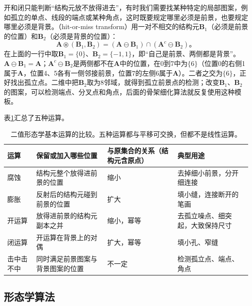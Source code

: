 开和闭只能判断“结构元放不放得进去”，有时我们需要找某种特定的局部图案，例如孤立的单点、线段的端点或某种角点，这时既要规定哪里必须是前景，也要规定哪里必须是背景。（hit-or-miss transform）用一对不相交的结构元$\bm{B}_1$（必须是前景的位置）和$\bm{B}_2$（必须是背景的位置）：
\begin{equation}
  \bm{A}\circledast(\bm{B}_1,\bm{B}_2)=(\bm{A}\ominus\bm{B}_1)\cap(\bm{A}^{c}\ominus\bm{B}_2)\text{。}
  \label{eq:vision-transforms-hit-or-miss}
\end{equation}
在上面的一行中取$\bm{B}_1=\{0\}$、$\bm{B}_2=\{-1,1\}$，即“自己是前景、两侧都是背景”。$\bm{A}\ominus\bm{B}_1=\bm{A}$；$\bm{A}^{c}\ominus\bm{B}_2$是两侧都不在$\bm{A}$中的位置，在0到7中为$\{6\}$（位置0的右侧1属于$\bm{A}$，位置4、5各有一侧邻接前景，位置7的左侧6属于$\bm{A}$）。二者之交为$\{6\}$，正好找出孤立点。二维中把$\bm{B}_2$取为8邻域，就得到孤立前景点的检测；改变$\bm{B}_1$、$\bm{B}_2$的图案，可以检测端点、分叉点和角点，后面的骨架细化算法就反复使用这种模板。

表\ref{tab:vision-transforms-morphology-compare}汇总了五种运算。

\begin{table}[htbp]
  \centering
  \small
  \begin{tabularx}{\linewidth}{@{}p{22mm}XXX@{}}
    \toprule
    运算 & 保留或加入哪些位置 & 与原集合的关系（结构元含原点） & 典型用途\\
    \midrule
    腐蚀 & 结构元整个放得进前景的位置 & 缩小 & 去掉细小前景，分开细连接\\
    膨胀 & 反射后的结构元碰到前景的位置 & 扩大 & 填小缝，连接断开的笔画\\
    开运算 & 放得进前景的结构元副本之并 & 缩小，幂等 & 去孤立噪点、细突起，大致保持尺寸\\
    闭运算 & 开运算在背景上的对偶 & 扩大，幂等 & 填小孔、窄缝\\
    击中击不中 & 同时满足前景图案与背景图案的位置 & 不一定 & 检测孤立点、端点、角点\\
    \bottomrule
  \end{tabularx}
  \caption{二值形态学基本运算的比较。五种运算都与平移可交换，但都不是线性运算。}
  \label{tab:vision-transforms-morphology-compare}
\end{table}

\subsection{形态学算法}
\label{sec:vision-transforms-morphology-algorithms}

